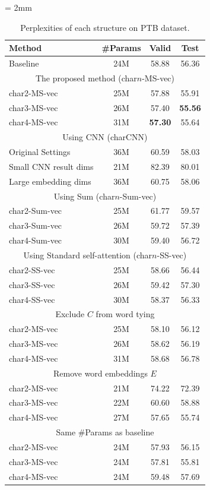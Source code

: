 \documentclass[letterpaper]{article} %
\begin{document}
\begin{table}[!t]
  \centering
  \small
  \tabcolsep = 2mm
  \begin{tabular}{ l | c | c  c  }
  \toprule
  Method & \#Params & Valid & Test \\
  \midrule
  Baseline  & 24M & 58.88 & 56.36 \\
  \midrule
  \multicolumn{4}{c}{The proposed method (char$n$-MS-vec)} \\
  \midrule
  char2-MS-vec & 25M & 57.88 & 55.91 \\
  char3-MS-vec & 26M & 57.40 & {\bf 55.56} \\
  char4-MS-vec & 31M & {\bf 57.30} & 55.64 \\
  \midrule
  \multicolumn{4}{c}{Using CNN (charCNN)} \\
  \midrule
  Original Settings & 36M & 60.59 & 58.03 \\
  Small CNN result dims & 21M & 82.39 & 80.01\\
  Large embedding dims & 36M & 60.75 & 58.06 \\
  \midrule
  \multicolumn{4}{c}{Using Sum (char$n$-Sum-vec)} \\
  \midrule
  char2-Sum-vec & 25M & 61.77 & 59.57 \\
  char3-Sum-vec & 26M & 59.72 & 57.39 \\
  char4-Sum-vec & 30M & 59.40 & 56.72 \\
  \midrule
  \multicolumn{4}{c}{Using Standard self-attention (char$n$-SS-vec)} \\
  \midrule
  char2-SS-vec & 25M & 58.66 & 56.44 \\
  char3-SS-vec & 26M & 59.42 & 57.30 \\
  char4-SS-vec & 30M & 58.37 & 56.33 \\
  \midrule
  \multicolumn{4}{c}{Exclude $C$ from word tying} \\
  \midrule
  char2-MS-vec & 25M & 58.10 & 56.12 \\
  char3-MS-vec & 26M & 58.62 & 56.19 \\
  char4-MS-vec & 31M & 58.68 & 56.78 \\
  \midrule
  \multicolumn{4}{c}{Remove word embeddings $E$} \\
  \midrule
  char2-MS-vec & 21M & 74.22 & 72.39 \\
  char3-MS-vec & 22M & 60.60 & 58.88 \\
  char4-MS-vec & 27M & 57.65 & 55.74 \\
  \midrule
  \multicolumn{4}{c}{Same \#Params as baseline} \\
  \midrule
  char2-MS-vec & 24M & 57.93 & 56.15 \\
  char3-MS-vec & 24M & 57.81 & 55.81 \\
  char4-MS-vec & 24M & 59.48 & 57.69 \\  
  \bottomrule
  \end{tabular}
  \caption{Perplexities of each structure on PTB dataset.\label{tab:ablation}}
\end{table}
\end{document}
